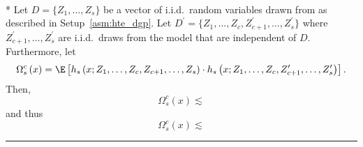 \newpage
\begin{lem}\label{lem:CATE_omega_sc}\mbox{}\\*
	Let $D = \{Z_1, \dotsc, Z_{s}\}$ be a vector of i.i.d.\ random variables drawn from as described in Setup~\ref{asm:hte_dgp}.
	Let $D^{\prime} = \{Z_1, \dotsc, Z_{c}, Z_{c+1}^{\prime}, \dotsc,  Z_{s}^{\prime}\}$ where $Z_{c+1}^{\prime}, \dotsc,  Z_{s}^{\prime}$ are i.i.d.\ draws from the model that are independent of $D$.
	Furthermore, let
	\begin{equation}
		\Omega_{s}^{c}\left(x\right)
		= \E\left[h_{s}\left(x; Z_1, \ldots, Z_{c}, Z_{c+1}, \ldots, Z_{s}\right) \cdot
			h_{s}\left(x; Z_1, \ldots,Z_{c}, Z_{c+1}^{\prime}, \ldots, Z_{s}^{\prime}\right)\right].
	\end{equation}
	Then,
	\begin{equation}
		\Omega_{s}^{c}\left(x\right)
		\lesssim 
	\end{equation}
	and thus
	\begin{equation}
		\Omega_{s}^{c}\left(x\right)
		\lesssim 
	\end{equation}
\end{lem}
\hrule
